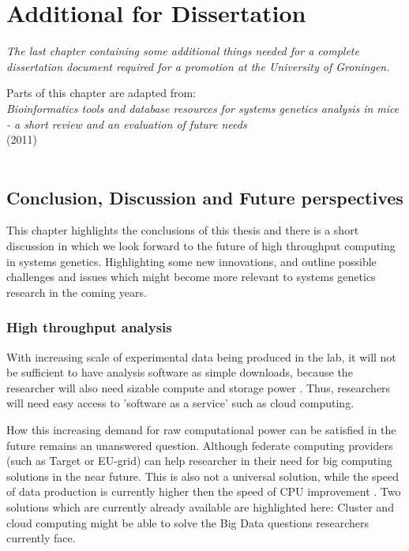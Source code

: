 \chapter{Additional for Dissertation}
\thispagestyle{empty}
\emph{The last chapter containing some additional things needed for a complete 
dissertation document required for a promotion at the University of Groningen.}
\null
\vfill

\begin{myexampleblock}{Parts of this chapter are adapted from:}
  \\
  \emph{ Bioinformatics tools and database resources for systems genetics analysis in mice 
         - a short review and an evaluation of future needs}\\
   (2011)\\\\
\end{myexampleblock}

\newpage

\section{Conclusion, Discussion and Future perspectives}
This chapter highlights the conclusions of this thesis and there is a short discussion in 
which we look forward to the future of high throughput computing in systems genetics. 
Highlighting some new innovations, and outline possible challenges and issues which might 
become more relevant to systems genetics research in the coming years.

\subsection{High throughput analysis}
With increasing scale of experimental data being produced in the lab, it will not be 
sufficient to have analysis software as simple downloads, because the researcher will 
also need sizable compute and storage power \cite{Schadt:2010}. Thus, researchers will 
need easy access to 'software as a service' such as cloud computing. 

How this increasing demand for raw computational power can be satisfied in the future remains 
an unanswered question. Although federate computing providers (such as Target or EU-grid) can help 
researcher in their need for big computing solutions in the near future. This is also not a 
universal solution, while the speed of data production is currently higher then the speed of 
CPU improvement \cite{Moore:1998, Editorial:2009, Shah:2013}. Two solutions which are 
currently already available are highlighted here: Cluster and cloud computing might be able to 
solve the Big Data questions researchers currently face.

